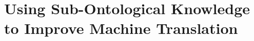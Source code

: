 








\chapter{Using Sub-Ontological Knowledge to Improve Machine Translation}
\label{chap:clustercat}

